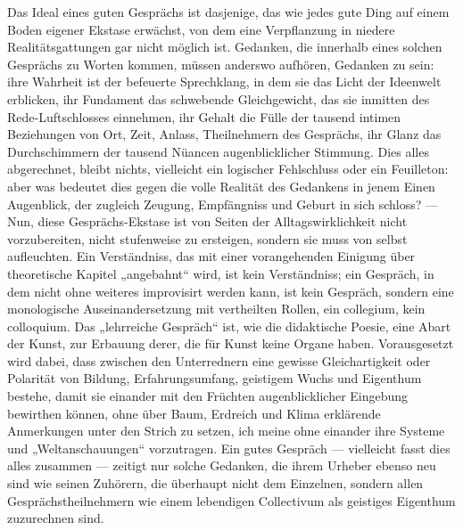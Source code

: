 Das Ideal eines guten Gesprächs ist dasjenige, das wie jedes gute Ding auf einem Boden eigener Ekstase erwächst, von dem eine Verpflanzung in niedere Realitätsgattungen gar nicht möglich ist. Gedanken, die innerhalb eines solchen Gesprächs zu Worten kommen, müssen anderswo aufhören, Gedanken zu sein: ihre Wahrheit ist der befeuerte Sprechklang, in dem sie das Licht der Ideenwelt erblicken, ihr Fundament das schwebende Gleichgewicht, das sie inmitten des Rede-Luftschlosses einnehmen, ihr Gehalt die Fülle der tausend intimen Beziehungen von Ort, Zeit, Anlass, Theilnehmern des Gesprächs, ihr Glanz das Durchschimmern der tausend Nüancen augenblicklicher Stimmung. Dies alles abgerechnet, bleibt nichts, vielleicht ein logischer Fehlschluss oder ein Feuilleton: aber was bedeutet dies gegen die volle Realität des Gedankens in jenem Einen Augenblick, der zugleich Zeugung, Empfängniss und Geburt in sich schloss? — Nun, diese Gesprächs-Ekstase ist von Seiten der Alltagswirklichkeit nicht vorzubereiten, nicht stufenweise zu ersteigen, sondern sie muss von selbst aufleuchten. Ein Verständniss, das mit einer vorangehenden Einigung über theoretische Kapitel „angebahnt“ wird, ist kein Verständniss; ein Gespräch, in dem nicht ohne weiteres improvisirt werden kann, ist kein Gespräch, sondern eine monologische Auseinandersetzung mit vertheilten Rollen, ein collegium, kein colloquium. Das „lehrreiche Gespräch“ ist, wie die didaktische Poesie, eine Abart der Kunst, zur Erbauung derer, die für Kunst keine Organe haben. Vorausgesetzt wird dabei, dass zwischen den Unterrednern eine gewisse Gleichartigkeit oder Polarität von Bildung, Erfahrungsumfang, geistigem Wuchs und Eigenthum bestehe, damit sie einander mit den Früchten augenblicklicher Eingebung bewirthen können, ohne über Baum, Erdreich und Klima erklärende Anmerkungen unter den Strich zu setzen, ich meine ohne einander ihre Systeme und „Weltanschauungen“ vorzutragen. Ein gutes Gespräch — vielleicht fasst dies alles zusammen — zeitigt nur solche Gedanken, die ihrem Urheber ebenso neu sind wie seinen Zuhörern, die überhaupt nicht dem Einzelnen, sondern allen Gesprächstheilnehmern wie einem lebendigen Collectivum als geistiges Eigenthum zuzurechnen sind.
\par

